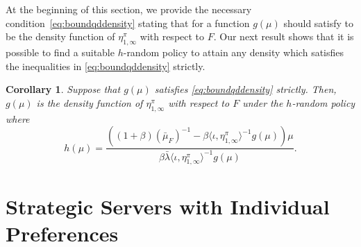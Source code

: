 \documentclass[a4paper,11pt,twoside]{article}
\numberwithin{equation}{section}
\numberwithin{figure}{section}
\theoremstyle{plain}
\newtheorem{theorem}{Theorem}[section]
\newtheorem{lemma}[theorem]{Lemma}
\newtheorem{corollary}[theorem]{Corollary}
\newcommand{\NN}{\mathbb{N}}
\newcommand{\1}{\mathbbm{1}}
\begin{document}
At the beginning of this section, we provide the necessary condition~\eqref{eq:boundqddensity} stating that for a function $g(\mu)$ should satisfy to be the density function of $\eta_{1,\infty}^\pi$ with respect to $F$. Our next result shows that it is possible to find a suitable $h$-random policy to attain any density which satisfies the inequalities in \eqref{eq:boundqddensity} strictly. 
\begin{corollary}\label{cor:attainability_g}
Suppose that $g(\mu)$ satisfies \eqref{eq:boundqddensity} strictly. Then, $g(\mu)$ is the density function of $\eta_{1,\infty}^\pi$ with respect to $F$ under the $h$-random policy where 
\[
h(\mu)=\frac{\left((1+\beta)(\bar{\mu}_F)^{-1}-\beta\langle \iota,\eta_{1,\infty}^\pi \rangle^{-1}g(\mu)\right)\mu}{\beta\bar{\lambda}\langle \iota,\eta_{1,\infty}^\pi \rangle^{-1}g(\mu)}.
\]
\end{corollary}





\section{Strategic Servers with Individual Preferences} \label{sec:strategic}
\end{document}
